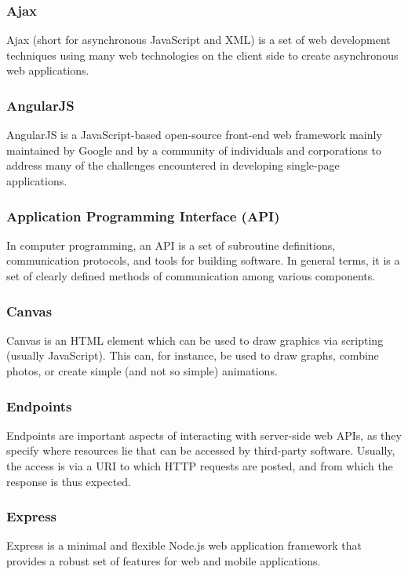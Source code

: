 \subsubsection*{Ajax}
Ajax (short for asynchronous JavaScript and XML) is a set of web development techniques using many web technologies on the client side to create asynchronous web applications.

\subsubsection*{AngularJS}
AngularJS is a JavaScript-based open-source front-end web framework mainly maintained by Google and by a community of individuals and corporations to address many of the challenges encountered in developing single-page applications.

\subsubsection*{Application Programming Interface (API)}
In computer programming, an API is a set of subroutine definitions, communication protocols, and tools for building software. In general terms, it is a set of clearly defined methods of communication among various components.

\subsubsection*{Canvas}
Canvas is an HTML element which can be used to draw graphics via scripting (usually JavaScript). This can, for instance, be used to draw graphs, combine photos, or create simple (and not so simple) animations.

\subsubsection*{Endpoints}
Endpoints are important aspects of interacting with server-side web APIs, as they specify where resources lie that can be accessed by third-party software. Usually, the access is via a URI to which HTTP requests are posted, and from which the response is thus expected.

\subsubsection*{Express}
Express is a minimal and flexible Node.js web application framework that provides a robust set of features for web and mobile applications.

